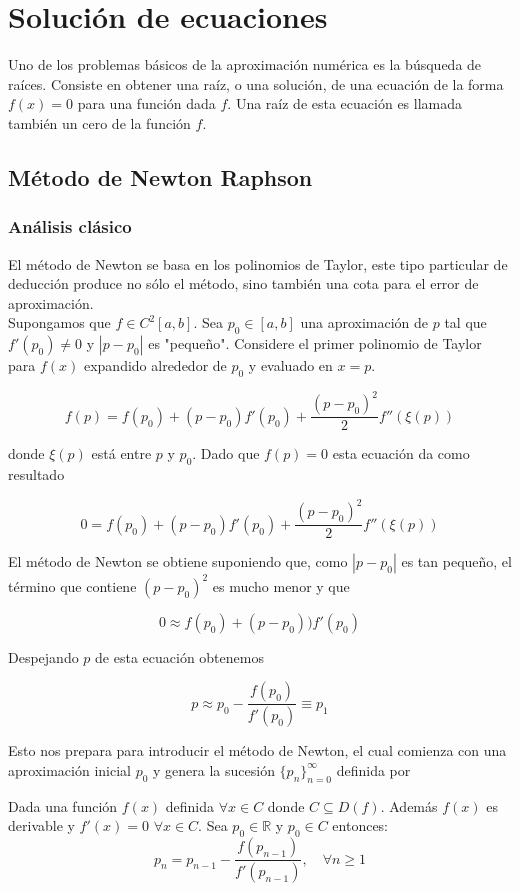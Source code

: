 \chapter{Solución de ecuaciones}
Uno de los problemas básicos de la aproximación numérica es la búsqueda de raíces. Consiste en obtener una raíz, 
o una solución, de una ecuación de la forma $f(x)=0$ para una función dada $f$. Una raíz de esta ecuación es 
llamada también un cero de la función $f$. 

\section{Método de Newton Raphson}

\subsection{Análisis clásico}

El método de Newton se basa en los polinomios de Taylor, este tipo particular de deducción produce no sólo el método, 
sino también una cota para el error de aproximación.\\
Supongamos que $f\in C^{2}[a, b]$. Sea $p_{0} \in [a, b]$ una aproximación de $p$ tal que $f'(p_{0}) \not= 0$ y 
$|p - p_{0}|$ es "pequeño". Considere el primer polinomio de Taylor para $f(x)$ expandido alrededor de $p_{0}$ y 
evaluado en $x=p$.

$$f(p) = f(p_{0}) + (p-p_{0})f'(p_{0}) + \frac{(p-p_{0})^{2}}{2}f''(\xi(p))$$

donde $\xi(p)$ está entre $p$ y $p_{0}$. Dado que $f(p)=0$ esta ecuación da como resultado

$$0 = f(p_{0}) + (p-p_{0})f'(p_{0}) + \frac{(p-p_{0})^{2}}{2}f''(\xi(p))$$

El método de Newton se obtiene suponiendo que, como $|p-p_{0}|$ es tan pequeño, el término que contiene $(p-p_{0})^{2}$ 
es mucho menor y que

$$0 \approx f(p_{0}) + (p-p_{0}))f'(p_{0})$$

Despejando $p$ de esta ecuación obtenemos

$$p\approx p_{0} - \frac{f(p_{0})}{f'(p_{0})} \equiv p_{1}$$

Esto nos prepara para introducir el método de Newton, el cual comienza con una aproximación inicial $p_{0}$ y genera 
la sucesión $\{ p_{n}\}_{n=0}^{\infty}$ definida por

\begin{theorem}
Dada una función $f(x)$ definida $\forall x\in C$ donde $C\subseteq D(f)$. Además $f(x)$ es derivable y $f'(x)=0$ 
$\forall x\in C$. Sea $p_0\in\mathbb{R}$ y $p_0\in C$ entonces:  
	\[p_{n} = p_{n-1} - \frac{f(p_{n-1})}{f'(p_{n-1})},\quad \forall n\geq 1\]
	\label{eq:Newton}
\end{theorem}

